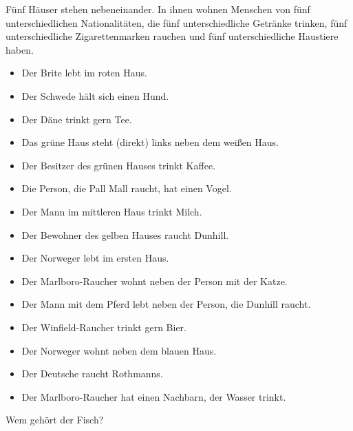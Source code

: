 \documentclass{zusammenfassung}
\begin{document}
\begin{aufgabe}
Fünf Häuser stehen nebeneinander. In ihnen wohnen Menschen von fünf unterschiedlichen Nationalitäten, die 
fünf unterschiedliche Getränke trinken, fünf unterschiedliche Zigarettenmarken rauchen und fünf unterschiedliche Haustiere haben.

\begin{itemize}
  \item Der Brite lebt im roten Haus.
  \item Der Schwede hält sich einen Hund.
  \item Der Däne trinkt gern Tee.
  \item Das grüne Haus steht (direkt) links neben dem weißen Haus.
  \item Der Besitzer des grünen Hauses trinkt Kaffee.
  \item Die Person, die Pall Mall raucht, hat einen Vogel.
  \item Der Mann im mittleren Haus trinkt Milch.
  \item Der Bewohner des gelben Hauses raucht Dunhill.
  \item Der Norweger lebt im ersten Haus.
  \item Der Marlboro-Raucher wohnt neben der Person mit der Katze.
  \item Der Mann mit dem Pferd lebt neben der Person, die Dunhill raucht.
  \item Der Winfield-Raucher trinkt gern Bier.
  \item Der Norweger wohnt neben dem blauen Haus.
  \item Der Deutsche raucht Rothmanns.
  \item Der Marlboro-Raucher hat einen Nachbarn, der Wasser trinkt.
\end{itemize}

Wem gehört der Fisch?
\end{aufgabe}
\end{document}
